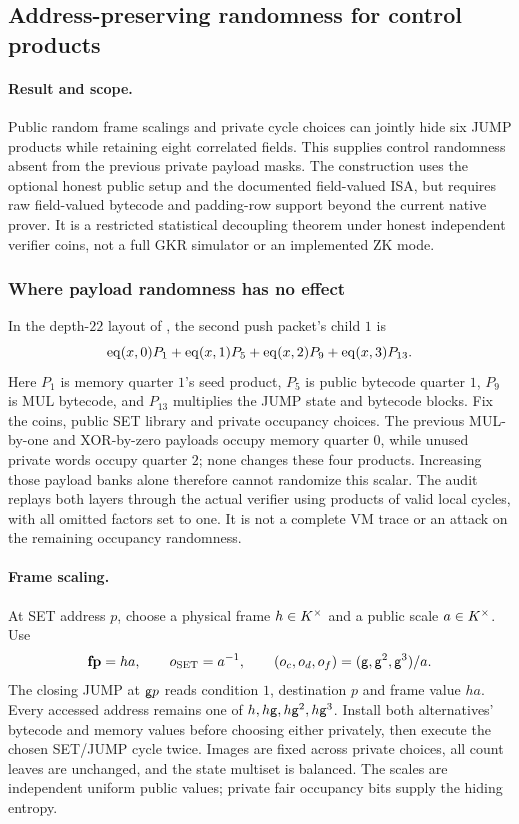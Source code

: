 \subsection{Address-preserving randomness for control products}\label{note:zk-frame-gauge}

\paragraph{Result and scope.} Public random frame scalings and private cycle choices can jointly hide six JUMP products while retaining eight correlated fields. This supplies control randomness absent from the previous private payload masks. The construction uses the optional honest public setup and the documented field-valued ISA, but requires raw field-valued bytecode and padding-row support beyond the current native prover. It is a restricted statistical decoupling theorem under honest independent verifier coins, not a full GKR simulator or an implemented ZK mode.

\subsubsection{Where payload randomness has no effect}

In the depth-$22$ layout of , the second push packet's child $1$ is
\[
 \operatorname{eq}(x,0)P_1+\operatorname{eq}(x,1)P_5+\operatorname{eq}(x,2)P_9+\operatorname{eq}(x,3)P_{13}.
\]
Here $P_1$ is memory quarter $1$'s seed product, $P_5$ is public bytecode quarter $1$, $P_9$ is MUL bytecode, and $P_{13}$ multiplies the JUMP state and bytecode blocks. Fix the coins, public SET library and private occupancy choices. The previous MUL-by-one and XOR-by-zero payloads occupy memory quarter $0$, while unused private words occupy quarter $2$; none changes these four products. Increasing those payload banks alone therefore cannot randomize this scalar. The audit replays both layers through the actual verifier using products of valid local cycles, with all omitted factors set to one. It is not a complete VM trace or an attack on the remaining occupancy randomness.

\paragraph{Frame scaling.} At SET address $p$, choose a physical frame $h\in K^\times$ and a public scale $a\in K^\times$. Use
\[
 \mathbf{fp}=ha,\qquad o_{\rm SET}=a^{-1},\qquad
 (o_c,o_d,o_f)=(\mathsf{g},\mathsf{g}^2,\mathsf{g}^3)/a.
\]
The closing JUMP at $\mathsf{g} p$ reads condition $1$, destination $p$ and frame value $ha$. Every accessed address remains one of $h,h\mathsf{g},h\mathsf{g}^2,h\mathsf{g}^3$. Install both alternatives' bytecode and memory values before choosing either privately, then execute the chosen SET/JUMP cycle twice. Images are fixed across private choices, all count leaves are unchanged, and the state multiset is balanced. The scales are independent uniform public values; private fair occupancy bits supply the hiding entropy.

